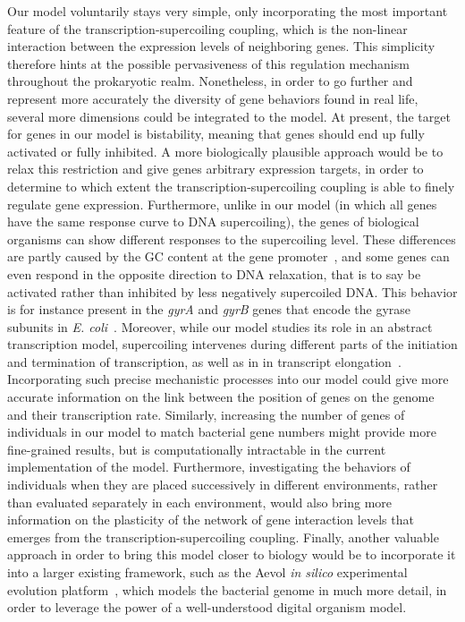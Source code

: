 Our model voluntarily stays very simple, only incorporating the most important feature of the transcription-supercoiling coupling, which is the non-linear interaction between the expression levels of neighboring genes.
This simplicity therefore hints at the possible pervasiveness of this regulation mechanism throughout the prokaryotic realm.
Nonetheless, in order to go further and represent more accurately the diversity of gene behaviors found in real life, several more dimensions could be integrated to the model.
At present, the target for genes in our model is bistability, meaning that genes should end up fully activated or fully inhibited.
A more biologically plausible approach would be to relax this restriction and give genes arbitrary expression targets, in order to determine to which extent the transcription-supercoiling coupling is able to finely regulate gene expression.
Furthermore, unlike in our model (in which all genes have the same response curve to DNA supercoiling), the genes of biological organisms can show different responses to the supercoiling level.
These differences are partly caused by the GC content at the gene promoter~\citep{forquet2021}, and some genes can even respond in the opposite direction to DNA relaxation, that is to say be activated rather than inhibited by less negatively supercoiled DNA.
This behavior is for instance present in the \emph{gyrA} and \emph{gyrB} genes that encode the gyrase subunits in \emph{E. coli}~\citep{peter2004}.
Moreover, while our model studies its role in an abstract transcription model, supercoiling intervenes during different parts of the initiation and termination of transcription, as well as in in transcript elongation~\citep{martisb.2019}.
Incorporating such precise mechanistic processes into our model could give more accurate information on the link between the position of genes on the genome and their transcription rate.
Similarly, increasing the number of genes of individuals in our model to match bacterial gene numbers might provide more fine-grained results, but is computationally intractable in the current implementation of the model.
Furthermore, investigating the behaviors of individuals when they are placed successively in different environments, rather than evaluated separately in each environment, would also bring more information on the plasticity of the network of gene interaction levels that emerges from the transcription-supercoiling coupling.
Finally, another valuable approach in order to bring this model closer to biology would be to incorporate it into a larger existing framework, such as the Aevol \emph{in silico} experimental evolution platform~\citep{rutten2019}, which models the bacterial genome in much more detail, in order to leverage the power of a well-understood digital organism model.

